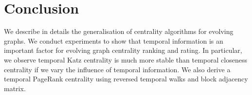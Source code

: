 \documentclass[12pt]{article}
\theoremstyle{definition}
\begin{document}
\section{Conclusion}
\label{sec:conclusion}

We describe in details the generalisation of centrality algorithms for evolving graphs.
We conduct experiments to show that temporal information is an important factor for evolving graph centrality ranking and rating. In particular, we observe temporal Katz centrality is much more stable than temporal closeness centrality if we vary the influence of temporal information.
We also derive a temporal PageRank centrality using reversed temporal walks and block adjacency matrix.



\end{document}
